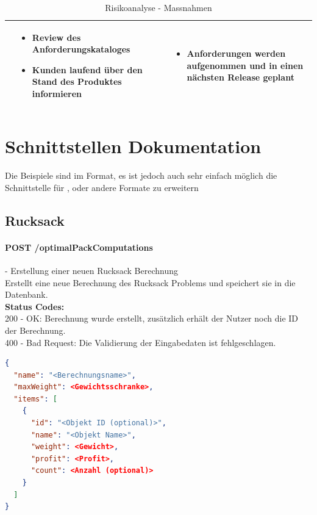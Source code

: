 \begin{table}[ht]
\begin{tabular}{  l | p{4.5cm} | p{4.5cm} }
								&	\begin{itemize}
										\item Review des Anforderungskataloges
										\item Kunden laufend über den Stand des Produktes informieren
									\end{itemize}
								&	\begin{itemize}
										\item Anforderungen werden aufgenommen und in einen nächsten Release geplant							
									\end{itemize}	\\ \hline			
  \end{tabular}
   \caption{Risikoanalyse - Massnahmen}
\end{table}

\clearpage
\newpage

\section{Schnittstellen Dokumentation}\label{api_doc}

Die Beispiele sind im  Format, es ist jedoch auch sehr einfach möglich die Schnittstelle für ,  oder andere Formate zu erweitern

%
%
%
%

\subsection{Rucksack}

\paragraph{POST /optimalPackComputations} - Erstellung einer neuen Rucksack Berechnung\mbox{}\\
Erstellt eine neue Berechnung des Rucksack Problems und speichert sie in die Datenbank.\\
\textbf{Status Codes:}\\
200 - OK: Berechnung wurde erstellt, zusätzlich erhält der Nutzer noch die ID der Berechnung.\\
400 - Bad Request: Die Validierung der Eingabedaten ist fehlgeschlagen.\\

\begin{lstlisting}[language=JSON, caption=Beispiel einer Eingabe für das Rucksack Problem, label=lst:input_knapsack]  
{
  "name": "<Berechnungsname>",
  "maxWeight": <Gewichtsschranke>,
  "items": [
    {
      "id": "<Objekt ID (optional)>",
      "name": "<Objekt Name>",
      "weight": <Gewicht>,
      "profit": <Profit>,
      "count": <Anzahl (optional)>
    }
  ]
}
\end{lstlisting}

